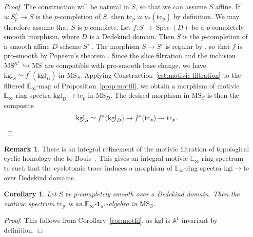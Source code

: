 \documentclass{amsart}
\numberwithin{equation}{section}
\theoremstyle{plain}
\newtheorem{corollary}[equation]{Corollary}
\theoremstyle{definition}
\newtheorem{remark}[equation]{Remark}
\let\bb=\mathbb
\def\A{\bb A}
\def\1{\mathbf 1}
\let\into=\hookrightarrow
\DeclareMathOperator{\Spec}{Spec}
\def\E{\mathbb{E}}
\def\MS{\mathrm{MS}}
\newcommand{\kgl}{\mathrm{kgl}}
\newcommand{\tc}{\mathrm{tc}}
\begin{document}
\begin{proof}
	The construction will be natural in $S$, so that we can assume $S$ affine.
	If $u\colon S^\wedge_p\to S$ is the $p$-completion of $S$, then $\tc_p\simeq u_*(\tc_p)$ by definition. We may therefore assume that $S$ is $p$-complete.
	Let $f\colon S\to \Spec(D)$ be a $p$-completely smooth morphism, where $D$ is a Dedekind domain.
	Then $S$ is the $p$-completion of a smooth affine $D$-scheme $S'$ \cite[Remark 5.13]{AMM}.
	The morphism $S\to S'$ is regular by \cite[Tags 07PX and 0AH2]{stacks}, so that $f$ is pro-smooth by Popescu's theorem \cite[Tag 07GC]{stacks}. Since the slice filtration and the inclusion $\MS^{\smash[t]{\A^1}}\into\MS$ are compatible with pro-smooth base change, we have $\kgl_S\simeq f^*(\kgl_D)$ in $\MS_S$. Applying Construction~\ref{cst:motivic-filtration} to the filtered $\E_\infty$-map of Proposition~\ref{prop:motfil}, we obtain a morphism of motivic $\E_\infty$-ring spectra $\kgl_D\to\tc_p$ in $\MS_D$.
	The desired morphism in $\MS_S$ is then the composite
	\[
	\kgl_S\simeq f^*(\kgl_D) \to f^*(\tc_p) \to \tc_p.\qedhere
	\]
\end{proof}

\begin{remark}
There is an integral refinement of the motivic filtration of topological cyclic homology due to Bouis~\cite{Bou}.
This gives an integral motivic $\E_\infty$-ring spectrum $\tc$ such that the cyclotomic trace induces a morphism of $\E_\infty$-ring spectra $\kgl\to\tc$ over Dedekind domains.
\end{remark}

\begin{corollary}\label{cor:tc}
Let $S$ be $p$-completely smooth over a Dedekind domain. Then the motivic spectrum $\tc_p$ is an $\E_\infty$-$\1_{\A^1}$-algebra in $\MS_S$.
\end{corollary}

\begin{proof}
	This follows from Corollary~\ref{cor:motfil}, as $\kgl$ is $\A^1$-invariant by definition.
\end{proof}
\end{document}
